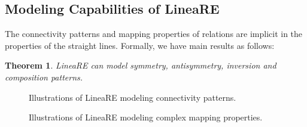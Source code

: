 \documentclass[conference]{IEEEtran}
\newtheorem{theorem}{Theorem}
\begin{document}
\subsection{Modeling Capabilities of LineaRE} \label{Capabilities}
The connectivity patterns and mapping properties of relations are implicit in the properties of the straight lines. Formally, we have main results as follows:
\begin{theorem}
	LineaRE can model symmetry, antisymmetry, inversion and composition patterns.
\end{theorem}
\begin{figure*}[t]
	\centering
	\caption{
		Illustrations of LineaRE modeling connectivity patterns.
	}
	\label{Pattern}
\end{figure*}
\begin{figure}[t]
	\centering
	\caption{
		Illustrations of LineaRE modeling complex mapping properties.
	}
	\label{Mapping}
\end{figure}
\end{document}
